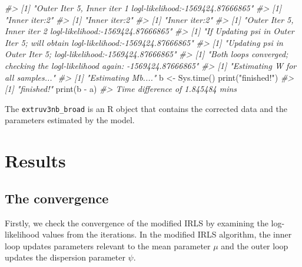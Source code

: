 \documentclass[]{article}
\newcommand{\hlstr}[1]{\textcolor[rgb]{0.251,0.627,0.251}{#1}}%
\newcommand{\hlcom}[1]{\textcolor[rgb]{0.502,0.502,0.502}{\textit{#1}}}%
\newcommand{\hlstd}[1]{\textcolor[rgb]{0.251,0.251,0.251}{#1}}%
\newenvironment{Shaded}{\begin{myshaded}}{\end{myshaded}}
\newcommand{\SpecialCharTok}[1]{\hlstr{#1}}
\newcommand{\StringTok}[1]{\hlstr{#1}}
\newcommand{\CommentTok}[1]{\hlcom{#1}}
\newcommand{\OtherTok}[1]{{#1}}
\newcommand{\FunctionTok}[1]{\hlstd{#1}}
\newcommand{\NormalTok}[1]{\hlstd{#1}}
\begin{document}
\begin{Shaded}
\begin{Highlighting}[]
\CommentTok{\#\textgreater{} [1] "Outer Iter 5, Inner iter 1 logl{-}likelihood:{-}1569424.87666865"}
\CommentTok{\#\textgreater{} [1] "Inner iter:2"}
\CommentTok{\#\textgreater{} [1] "Inner iter:2"}
\CommentTok{\#\textgreater{} [1] "Inner iter:2"}
\CommentTok{\#\textgreater{} [1] "Outer Iter 5, Inner iter 2 logl{-}likelihood:{-}1569424.87666865"}
\CommentTok{\#\textgreater{} [1] "If Updating psi in Outer Iter 5; will obtain logl{-}likelihood:{-}1569424.87666865"}
\CommentTok{\#\textgreater{} [1] "Updating psi in Outer Iter 5; logl{-}likelihood:{-}1569424.87666865"}
\CommentTok{\#\textgreater{} [1] "Both loops converged; checking the logl{-}likelihood again: {-}1569424.87666865"}
\CommentTok{\#\textgreater{} [1] "Estimating W for all samples..."}
\CommentTok{\#\textgreater{} [1] "Estimating Mb...."}
\NormalTok{b }\OtherTok{\textless{}{-}} \FunctionTok{Sys.time}\NormalTok{()}
\FunctionTok{print}\NormalTok{(}\StringTok{"finished!"}\NormalTok{)}
\CommentTok{\#\textgreater{} [1] "finished!"}
\FunctionTok{print}\NormalTok{(b }\SpecialCharTok{{-}}\NormalTok{ a)}
\CommentTok{\#\textgreater{} Time difference of 1.845484 mins}
\end{Highlighting}
\end{Shaded}

The \texttt{extruv3nb\_broad} is an R object that contains the corrected data and the parameters estimated by the model.

\section{Results}\label{results}

\subsection{The convergence}\label{the-convergence}

Firstly, we check the convergence of the modified IRLS by examining the log-likelihood values from the iterations. In the modified IRLS algorithm, the inner loop updates parameters relevant to the mean parameter \(\mu\) and the outer loop updates the dispersion parameter \(\psi\).
\end{document}
